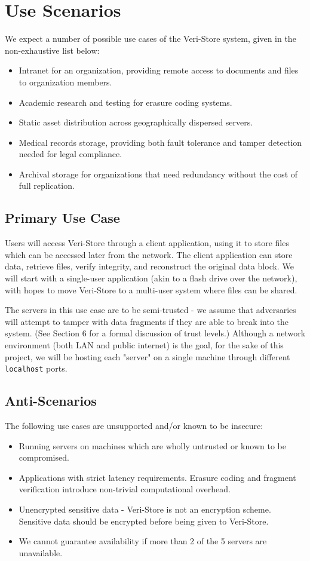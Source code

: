 \documentclass[../veristore_security_model.tex]{subfiles}
\begin{document}
\section{Use Scenarios}
We expect a number of possible use cases of the Veri-Store system, given in the non-exhaustive list below:

\begin{itemize}
    \item Intranet for an organization, providing remote access to documents and files to organization members.
    \item Academic research and testing for erasure coding systems.
    \item Static asset distribution across geographically dispersed servers.
    \item Medical records storage, providing both fault tolerance and tamper detection needed for legal compliance.
    \item Archival storage for organizations that need redundancy without the cost of full replication.
\end{itemize}

\subsection{Primary Use Case}
Users will access Veri-Store through a client application, using it to store files which can be accessed later from the network. The client application can store data, retrieve files, verify integrity, and reconstruct the original data block. We will start with a single-user application (akin to a flash drive over the network), with hopes to move Veri-Store to a multi-user system where files can be shared.

The servers in this use case are to be semi-trusted - we assume that adversaries will attempt to tamper with data fragments if they are able to break into the system. (See Section 6 for a formal discussion of trust levels.) Although a network environment (both LAN and public internet) is the goal, for the sake of this project, we will be hosting each "server" on a single machine through different \texttt{localhost} ports.

\subsection{Anti-Scenarios}
The following use cases are unsupported and/or known to be insecure:

\begin{itemize}
    \item Running servers on machines which are wholly untrusted or known to be compromised.
    \item Applications with strict latency requirements. Erasure coding and fragment verification introduce non-trivial computational overhead.
    \item Unencrypted sensitive data - Veri-Store is not an encryption scheme. Sensitive data should be encrypted before being given to Veri-Store.
    \item We cannot guarantee availability if more than 2 of the 5 servers are unavailable.
\end{itemize}

\newpage
\end{document}
